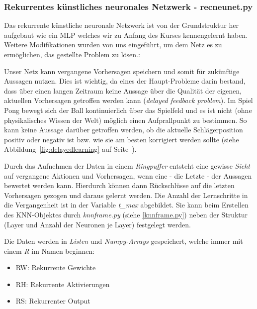 \documentclass[12pt,twoside]{article}
\theoremstyle{plain}
\theoremstyle{definition}
\theoremstyle{remark}
\begin{document}
\subsubsection{Rekurrentes künstliches neuronales Netzwerk - recneunet.py}
\label{recneunet.py}

Das rekurrente künstliche neuronale Netzwerk ist von der Grundstruktur her aufgebaut wie ein MLP welches wir zu Anfang des Kurses kennengelernt haben. Weitere  Modifikationen wurden von uns eingeführt, um dem Netz es zu ermöglichen, das gestellte Problem zu lösen.:

Unser Netz kann vergangene Vorhersagen speichern und somit für zukünftige Aussagen nutzen. Dies ist wichtig, da eines der Haupt-Probleme darin bestand, dass über einen langen Zeitraum keine Aussage über die Qualität der eigenen, aktuellen Vorhersagen getroffen werden kann (\textit{delayed feedback problem}). Im Spiel Pong bewegt sich der Ball kontinuierlich über das Spielfeld und es ist nicht (ohne physikalisches Wissen der Welt) möglich einen Aufprallpunkt zu bestimmen. So kann keine Aussage darüber getroffen werden, ob die aktuelle Schlägerposition positiv oder negativ ist bzw. wie sie am besten korrigiert werden sollte (siehe Abbildung~\ref{fig:delayedlearning} auf Seite~\pageref{fig:delayedlearning}).

Durch das Aufnehmen der Daten in einem \textit{Ringpuffer} entsteht eine gewisse \textit{Sicht} auf vergangene Aktionen und Vorhersagen, wenn eine - die Letzte - der Aussagen bewertet werden kann. Hierdurch können dann Rückschlüsse auf die letzten Vorhersagen gezogen und daraus gelernt werden. Die Anzahl der Lernschritte in die Vergangenheit ist in der Variable \textit{t\_max} abgebildet. Sie kann beim Erstellen des KNN-Objektes durch \textit{knnframe.py} (siehe \ref{knnframe.py}) neben der Struktur (Layer und Anzahl der Neuronen je Layer) festgelegt werden. 

Die Daten werden in \textit{Listen} und \textit{Numpy-Arrays} gespeichert, welche immer mit einem \textit{R} im Namen beginnen:
\begin{itemize}
  \item RW: Rekurrente Gewichte
  \item RH: Rekurrente Aktivierungen
  \item RS: Rekurrenter Output
\end{itemize}
\end{document}
